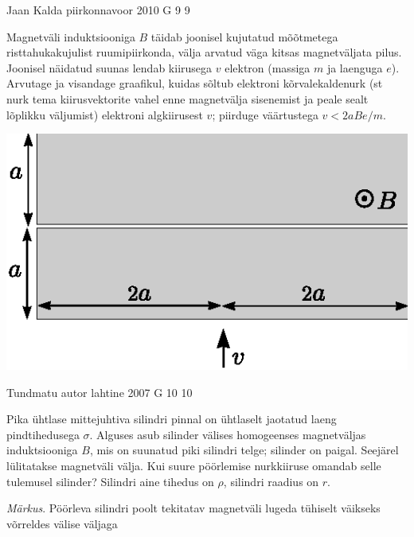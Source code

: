 \documentclass[11pt, twoside]{article}
\begin{document}
{%
{Jaan Kalda} %
{piirkonnavoor} %
{2010} %
{G 9} %
{9} %
{
\ifStatement
Magnetväli induktsiooniga $B$ täidab joonisel kujutatud mõõtmetega risttahukakujulist ruumipiirkonda, välja arvatud väga kitsas magnetväljata pilus.
Joonisel näidatud suunas lendab kiirusega $v$ elektron (massiga $m$ ja laenguga $e$). Arvutage ja visandage graafikul, kuidas sõltub elektroni kõrvalekaldenurk (st nurk tema kiirusvektorite vahel enne magnetvälja sisenemist ja peale sealt lõplikku väljumist) elektroni algkiirusest $v$; piirduge väärtustega $v<2aBe/m$.
\begin{center}
\includegraphics[width=0.5\linewidth]{2010-v2g-09-elektron.eps}
\end{center}
\fi
}

{Tundmatu autor} %
{lahtine} %
{2007} %
{G 10} %
{10} %
{
\ifStatement
Pika ühtlase mittejuhtiva silindri pinnal on ühtlaselt jaotatud laeng pindtihedusega $\sigma$. Alguses asub silinder välises homogeenses magnetväljas induktsiooniga $B$, mis on suunatud piki silindri telge; silinder on paigal. Seejärel lülitatakse magnetväli välja. Kui suure pöörlemise nurkkiiruse omandab selle tulemusel silinder? Silindri aine tihedus on $\rho$, silindri raadius on $r$. 

\emph{Märkus}. Pöörleva silindri poolt tekitatav magnetväli lugeda tühiselt väikseks võrreldes välise väljaga
\fi
}
\newpage\subsection{\protect{}}

}
\end{document}
